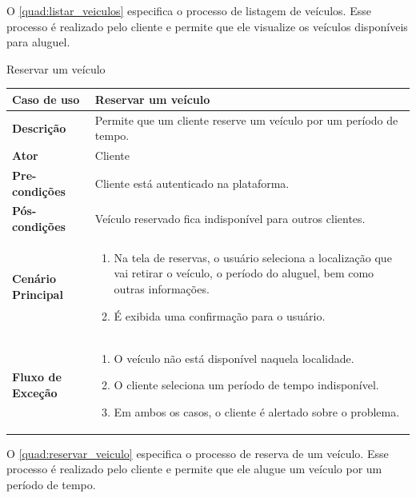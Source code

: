 O \autoref{quad:listar_veiculos} especifica o processo de listagem de veículos. Esse processo é realizado pelo cliente e permite que ele visualize os veículos disponíveis para aluguel.

\begin{quadro}[H]
    \centering
    \caption{Reservar um veículo}
    \label{quad:reservar_veiculo}
    \begin{tabular}{|p{1.2in}|p{3.5in}|}
    \hline
    
    \textbf{Caso de uso} & Reservar um veículo \\ \hline
    \textbf{Descrição} & Permite que um cliente reserve um veículo por um período de tempo. \\ \hline
    \textbf{Ator} & Cliente \\ \hline
    \textbf{Pre-condições} & Cliente está autenticado na plataforma. \\ \hline
    \textbf{Pós-condições} & Veículo reservado fica indisponível para outros clientes. \\ \hline
    \textbf{Cenário Principal} & \begin{enumerate}
        \item Na tela de reservas, o usuário seleciona a localização que vai retirar o veículo, o período do aluguel, bem como outras informações.
        \item É exibida uma confirmação para o usuário.
    \end{enumerate}  \\ \hline
    \textbf{Fluxo de Exceção} & \begin{enumerate}
        \item O veículo não está disponível naquela localidade.
        \item O cliente seleciona um período de tempo indisponível.  
        \item Em ambos os casos, o cliente é alertado sobre o problema.
    \end{enumerate}  \\ \hline
    \end{tabular} 
\end{quadro}

O \autoref{quad:reservar_veiculo} especifica o processo de reserva de um veículo. Esse processo é realizado pelo cliente e permite que ele alugue um veículo por um período de tempo.

